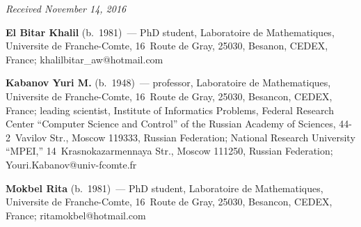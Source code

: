 \begin{multicols}{2}
{{\begin{thebibliography}{99}







\end{thebibliography} } }

\end{multicols}

\vspace*{-6pt}

\hfill{\small\textit{Received November 14, 2016}}


\Contr


\noindent
\textbf{El Bitar  Khalil} (b.\ 1981)~--- 
PhD student, Laboratoire de Mathematiques, Universite de Franche-Comte, 
16~Route de Gray, 25030, \mbox{Besan{\!}on}, CEDEX, France; 
\mbox{khalilbitar\_aw@hotmail.com}  

 \vspace*{1pt}
 
 \noindent
 \textbf{Kabanov Yuri M.} (b.\ 1948)~---
  professor, Laboratoire de Mathematiques, Universite de Franche-Comte, 
  16~Route de Gray, 25030, Besancon, CEDEX, France; leading scientist, 
  Institute of Informatics Problems, Federal Research Center 
  ``Computer Science and Control'' of the Russian Academy of Sciences,  
  44-2~Vavilov Str., Moscow 119333, Russian Federation; 
  National Research University ``MPEI,'' 14~Krasnokazarmennaya Str., 
  Moscow 111250, Russian Federation; \mbox{Youri.Kabanov@univ-fcomte.fr} 

\vspace*{1pt}
 
 \noindent
 \textbf{Mokbel Rita} (b.\ 1981)~--- 
 PhD student, Laboratoire de Mathematiques, Universite de Franche-Comte, 
 16~Route de Gray, 25030, Besancon, CEDEX, France; \mbox{ritamokbel@hotmail.com}




